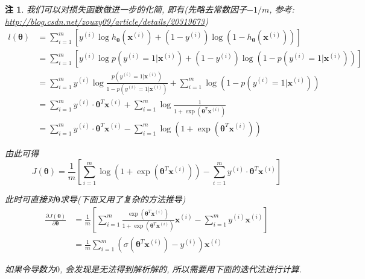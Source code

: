 \documentclass[a4paper,UTF8]{ctexart}
\theoremstyle{plain} \newtheorem{theorem}{定理}[section]
\theoremstyle{plain} \newtheorem{definition}{定义}[section]
\theoremstyle{plain} \newtheorem{lemma}{引理}[section]
\theoremstyle{plain} \newtheorem{proposition}{命题}[section]
\theoremstyle{plain} \newtheorem{example}{例}[section]
\theoremstyle{plain} \newtheorem{remark}{注}[section]
\theoremstyle{plain} \newtheorem{corollary}{推论}[section]
\newcommand{\p}[3]{\frac{\partial^{#1}#2}{\partial{#3}^{#1}}}  %
\begin{document}
\begin{remark}
我们可以对损失函数做进一步的化简, 即有(先略去常数因子$-1 / m$, 参考: \url{http://blog.csdn.net/zouxy09/article/details/20319673})
\begin{align*}
l(\bm{\theta}) & = \sum_{i=1}^{m} \left[y^{(i)} \log h_{\bm{\theta}}(\bm{x}^{(i)}) + (1-y^{(i)}) \log (1-h_{\bm{\theta}}(\bm{x}^{(i)})) \right] \\ 
& = \sum_{i=1}^{m} \left[y^{(i)} \log p(y^{(i)} = 1 | \bm{x}^{(i)}) + (1-y^{(i)}) \log (1 - p(y^{(i)} = 1 | \bm{x}^{(i)})) \right] \\
& = \sum_{i=1}^{m} y^{(i)} \log \frac{p(y^{(i)} = 1 | \bm{x}^{(i)})}{1 - p(y^{(i)} = 1 | \bm{x}^{(i)})} + \sum_{i=1}^{m} \log (1 - p(y^{(i)} = 1 | \bm{x}^{(i)})) \\ 
& = \sum_{i=1}^{m} y^{(i)} \cdot \bm{\theta}^{T} \bm{x}^{(i)} + \sum_{i=1}^{m} \log \frac{1}{1 + \exp (\bm{\theta}^{T} \bm{x}^{(i)})} \\ 
& = \sum_{i=1}^{m} y^{(i)} \cdot \bm{\theta}^{T} \bm{x}^{(i)} - \sum_{i=1}^{m} \log (1 + \exp (\bm{\theta}^{T} \bm{x}^{(i)}))
\end{align*}

由此可得
\begin{equation}\label{simplifyloss}
J(\bm{\theta}) = \frac{1}{m} \left[ \sum_{i=1}^{m} \log (1 + \exp (\bm{\theta}^{T} \bm{x}^{(i)})) - \sum_{i=1}^{m} y^{(i)} \cdot \bm{\theta}^{T} \bm{x}^{(i)} \right]
\end{equation}

此时可直接对$\bm{\theta}$求导(下面又用了复杂的方法推导)
\begin{align*}
\p{}{J(\bm{\theta})}{\bm{\theta}} & = \frac{1}{m} \left[ \sum_{i=1}^{m} \frac{\exp(\bm{\theta}^{T} \bm{x}^{(i)})}{1 + \exp(\bm{\theta}^{T} \bm{x}^{(i)})} \bm{x}^{(i)} - \sum_{i=1}^{m} y^{(i)} \bm{x}^{(i)} \right] \\ 
& = \frac{1}{m} \sum_{i=1}^{m} \left( \sigma(\bm{\theta}^{T} \bm{x}^{(i)}) - y^{(i)} \right) \bm{x}^{(i)}
\end{align*}

如果令导数为$0$, 会发现是无法得到解析解的, 所以需要用下面的迭代法进行计算.

\end{remark}
\end{document}
